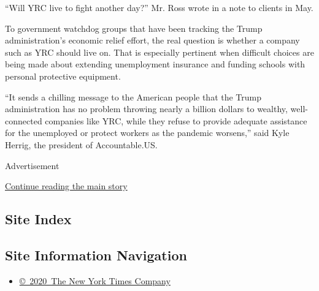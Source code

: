 ``Will YRC live to fight another day?'' Mr. Ross wrote in a note to
clients in May.

To government watchdog groups that have been tracking the Trump
administration's economic relief effort, the real question is whether a
company such as YRC should live on. That is especially pertinent when
difficult choices are being made about extending unemployment insurance
and funding schools with personal protective equipment.

``It sends a chilling message to the American people that the Trump
administration has no problem throwing nearly a billion dollars to
wealthy, well-connected companies like YRC, while they refuse to provide
adequate assistance for the unemployed or protect workers as the
pandemic worsens,'' said Kyle Herrig, the president of Accountable.US.

Advertisement

\protect\hyperlink{after-bottom}{Continue reading the main story}

\hypertarget{site-index}{%
\subsection{Site Index}\label{site-index}}

\hypertarget{site-information-navigation}{%
\subsection{Site Information
Navigation}\label{site-information-navigation}}

\begin{itemize}
\tightlist
\item
  \href{https://help.nytimes3xbfgragh.onion/hc/en-us/articles/115014792127-Copyright-notice}{©~2020~The
  New York Times Company}
\end{itemize}

